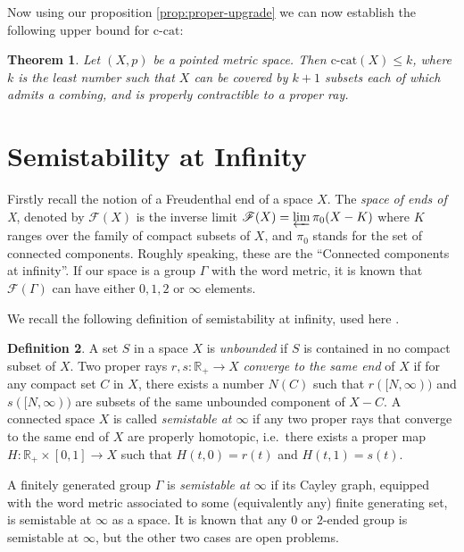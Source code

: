 \documentclass {amsart}
\newcommand {\ccat}     {\text{c-cat}}
\newcommand {\Rplus}    {\mathbb{R}_{+}}
\newtheorem   {theorem}               {Theorem}       [section]
\theoremstyle {definition}
\newtheorem   {definition}  [theorem] {Definition}
\begin{document}
Now using our proposition \ref{prop:proper-upgrade} we can now establish the
following upper bound for \( \ccat \):

\begin{theorem}
  \label{thm:ccat-pcat}
  Let \( (X,p) \) be a pointed metric space. Then \( \ccat (X) \leq k\), where
  \( k \) is the least number such that \( X \) can be covered by \( k+1 \)
  subsets each of which admits a combing, and is properly contractible to a
  proper ray.
\end{theorem}

\section {Semistability at Infinity} \label{sec:semistability}

Firstly recall the notion of a Freudenthal end of a space \( X \). The
\emph{space of ends of X}, denoted by \( \mathscr{F}(X) \) is the inverse limit
\( \mathscr{F} (X) = \varprojlim \pi_0 (X-K) \) where \( K \) ranges over the family of
compact subsets of \( X \), and \( \pi_0 \) stands for the set of connected
components. Roughly speaking, these are the ``Connected components at
infinity''.
If our space is a group \( \Gamma \) with the word metric, it is known that \(
\mathscr F (\Gamma)\)  can have either \( 0, 1, 2 \) or \( \infty \) elements.

We recall the following definition of semistability at infinity, used here
\cite{mihalikSemistabilityInfinitySimpleConnectivity1996}.

\begin{definition}
    A set \( S \) in a space \( X \) is \emph{unbounded} if \( S \) is contained
    in no compact subset of \( X \). Two proper rays \( r,s : \Rplus \to X \)
    \emph{converge to the same end} of \( X \) if for any compact set \( C \) in
    \( X \), there exists a number \( N(C) \) such that \( r([N,\infty)) \) and
    \( s([N,\infty)) \) are subsets of the same unbounded component of \( X - C
    \). A connected space \( X \) is called \emph{semistable at \( \infty \)} if
    any two proper rays that converge to the same end of \( X \) are properly
    homotopic, i.e.\ there exists a proper map \( H : \Rplus \times [0,1] \to X
    \) such that \( H(t,0) = r(t) \) and \( H(t,1) = s(t) \).
\end{definition}

A finitely generated group \( \Gamma \) is \emph{semistable at \( \infty \)} if
its Cayley graph, equipped with the word metric associated to some (equivalently
any) finite generating set, is semistable at \( \infty \) as a space. It is known
that any \( 0 \) or \( 2 \)-ended group is semistable at \( \infty \), but the
other two cases are open problems.
\end{document}
